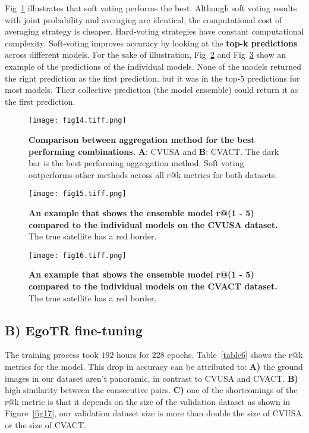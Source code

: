 \documentclass[10pt,letterpaper]{article}
\begin{document}
\FloatBarrier

Fig~\ref{fig14} illustrates that soft voting performs the best. Although soft voting results with joint probability and averaging are identical, the computational cost of averaging strategy is cheaper. Hard-voting strategies have constant computational complexity. Soft-voting improves accuracy by looking at the {\bf top-k predictions} across different models. For the sake of illustration,  Fig~\ref{fig15} and Fig~\ref{fig16} show an example of the predictions of the individual models. None of the models returned the right prediction as the first prediction, but it was in the top-5 predictions for most models. Their collective prediction (the model ensemble) could return it as the first prediction.

\begin{figure}[!ht]
  \caption{{\bf Comparison between aggregation method for the best performing combinations. } {\bf A}: CVUSA and {\bf B}: CVACT.  The dark bar is the best performing aggregation method. Soft voting outperforms other methods across all r@k metrics for both datasets.}
  \texttt{[image: fig14.tiff.png]}
  
  \label{fig14}
\end{figure}

\begin{figure}[!ht]
  \caption{{\bf An example that shows the ensemble model r@(1 - 5) compared to the individual models on the CVUSA dataset.} The true satellite has a red border.}
  \texttt{[image: fig15.tiff.png]}
  \label{fig15}
\end{figure}

\begin{figure}[!ht]
  \caption{{\bf An example that shows the ensemble model r@(1 - 5) compared to the individual models on the CVACT dataset.}  The true satellite has a red border.}
  \texttt{[image: fig16.tiff.png]}
  \label{fig16}
\end{figure}

\FloatBarrier

\subsection*{B) EgoTR fine-tuning}

The training process took $192$ hours for $228$ epochs. Table~\ref{table6} shows the r@k metrics for the model. This drop in accuracy can be attributed to: {\bf A)} the ground images in our dataset aren't panoramic, in contrast to CVUSA and CVACT. {\bf B)} high similarity between the consecutive pairs. {\bf C)} one of the shortcomings of the r@k metric is that it depends on the size of the validation dataset as shown in  Figure~\ref{fig17}, our validation dataset size is more than double the size of CVUSA or the size of CVACT.
\end{document}
